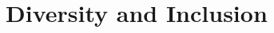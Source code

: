 \newpage
{}
\section{Diversity and Inclusion} \label{sec:diversity_inclusion}

\subsection{}
\label{sec:dni_}